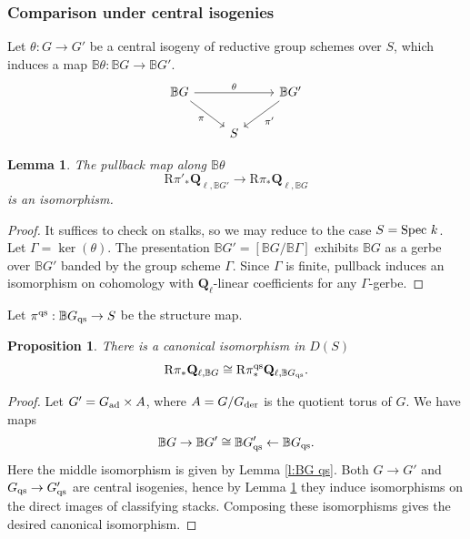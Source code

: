 \documentclass[reqno]{amsart}
\numberwithin{equation}{subsection}
\newtheorem{lemma}[subsubsection]{Lemma}
\newtheorem{prop}[subsubsection]{Proposition}
\theoremstyle{definition}
\def\BB{\mathbb{B}}
\newcommand\Spec{\textup{Spec}\ }
\newcommand{\ad}{\textup{ad}}
\newcommand{\der}{\textup{der}}
\newcommand{\Ql}{\Q_{\ell}}
\renewcommand{\th}{\theta}
\newcommand\qs{\textup{qs}}
\newcommand{\Q}{\mathbf{Q}}
\newcommand{\Qll}[1]{\Q_{\ell, #1}}
\newcommand{\rR}{\ensuremath{\mathrm{R}}\xspace}
\begin{document}
\subsubsection{Comparison under central isogenies}  Let $\theta \colon G \rightarrow G'$ be a central isogeny of reductive group schemes over $S$, which induces a map $\BB\th: \BB G\to \BB G'$.
\[
\begin{tikzcd}
\BB G \ar[rr, "\theta"] \ar[dr, "\pi"'] & & \BB G' \ar[dl, "\pi'"] \\
& S
\end{tikzcd}
\]

\begin{lemma}\label{lem: classifying cohomology pullback}
The pullback map along $\BB\th$ 
\begin{equation*}
\rR\pi'_* \Qll{\BB G'} \rightarrow \rR \pi_* \Qll{\BB G}
\end{equation*}
is an isomorphism. 
\end{lemma}
\begin{proof} It suffices to check on stalks, so we may reduce to the case $S=\Spec k$. Let $\Gamma=\ker(\theta)$.
The presentation $\BB G' = [\BB G/ \BB\Gamma]$ exhibits $\BB G$ as a gerbe over $\BB G'$ banded by the group scheme $\Gamma$. Since $\Gamma$ is finite, pullback induces an isomorphism on cohomology with $\Ql$-linear coefficients for any $\Gamma$-gerbe. 
\end{proof}


Let $\pi^{\qs}: \BB G_{\qs}\to S$ be the structure map. 
\begin{prop}\label{p:inv under isog} There is a canonical isomorphism in $D(S)$
\begin{equation*}
\rR \pi_* \Qll{\BB G}\cong \rR \pi^{\qs}_* \Qll{\BB G_{\qs}}.
\end{equation*}
\end{prop}
\begin{proof}
Let $G'=G_{\ad}\times A$, where $A=G/G_{\der}$ is the quotient torus of $G$. We have maps
\begin{equation*}
\BB G\to\BB G'\cong \BB G'_{\qs}\leftarrow \BB G_{\qs}.
\end{equation*}
Here the middle isomorphism is given by Lemma \ref{l:BG qs}. Both $G\to G'$ and $G_{\qs}\to G'_{\qs}$ are central isogenies, hence by Lemma \ref{lem: classifying cohomology pullback} they induce isomorphisms on the direct images of classifying stacks. Composing these isomorphisms gives the desired canonical isomorphism.
\end{proof}
\end{document}
